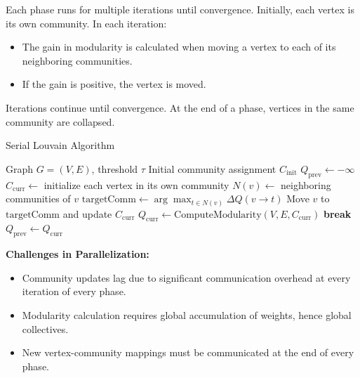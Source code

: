 \documentclass[12pt]{book}
\begin{document}
Each phase runs for multiple iterations until convergence. Initially, each vertex is its own community. In each iteration:
\begin{itemize}
    \item The gain in modularity is calculated when moving a vertex to each of its neighboring communities.
    \item If the gain is positive, the vertex is moved.
\end{itemize}
Iterations continue until convergence. At the end of a phase, vertices in the same community are collapsed.

\begin{algorithm}[H]
\caption{Serial Louvain Algorithm}
\label{alg:serialLouvian}
\begin{algorithmic}[1]
    \Require Graph $G=(V,E)$, threshold $\tau$
    \Require Initial community assignment $C_{\mathrm{init}}$
    \State $Q_{\mathrm{prev}} \gets -\infty$
    \State $C_{\mathrm{curr}} \gets$ initialize each vertex in its own community
        \State $N(v) \gets$ neighboring communities of $v$
        \State $\text{targetComm} \gets \arg\max_{t \in N(v)} \Delta Q(v \to t)$
          \State Move $v$ to $\text{targetComm}$ and update $C_{\mathrm{curr}}$
        \EndIf
      \EndFor
      \State $Q_{\mathrm{curr}} \gets \text{ComputeModularity}(V,E,C_{\mathrm{curr}})$
        \State \textbf{break}
      \Else
        \State $Q_{\mathrm{prev}} \gets Q_{\mathrm{curr}}$
      \EndIf
    \EndWhile
  \EndFunction
\end{algorithmic}
\end{algorithm}


\noindent \textbf{Challenges in Parallelization:}  
\begin{itemize}
    \item Community updates lag due to significant communication overhead at every iteration of every phase.
    \item Modularity calculation requires global accumulation of weights, hence global collectives.
    \item New vertex-community mappings must be communicated at the end of every phase.
\end{itemize}
\end{document}
